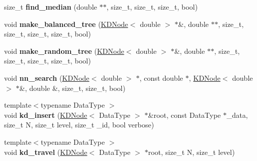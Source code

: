 \begin{DoxyCompactItemize}
\item 
\hypertarget{namespaceSimpleCluster_aac5892d8292ef724345d8c422519ae05}{size\-\_\-t {\bfseries find\-\_\-median} (double $\ast$$\ast$, size\-\_\-t, size\-\_\-t, size\-\_\-t, bool)}\label{namespaceSimpleCluster_aac5892d8292ef724345d8c422519ae05}

\item 
\hypertarget{namespaceSimpleCluster_a9b7733dc2edec70ad323beb9f3a9143e}{void {\bfseries make\-\_\-balanced\-\_\-tree} (\hyperlink{classSimpleCluster_1_1KDNode}{K\-D\-Node}$<$ double $>$ $\ast$\&, double $\ast$$\ast$, size\-\_\-t, size\-\_\-t, size\-\_\-t, size\-\_\-t, bool)}\label{namespaceSimpleCluster_a9b7733dc2edec70ad323beb9f3a9143e}

\item 
\hypertarget{namespaceSimpleCluster_a367a8fc15d6fd44d0c898dfc6bf6b409}{void {\bfseries make\-\_\-random\-\_\-tree} (\hyperlink{classSimpleCluster_1_1KDNode}{K\-D\-Node}$<$ double $>$ $\ast$\&, double $\ast$$\ast$, size\-\_\-t, size\-\_\-t, size\-\_\-t, size\-\_\-t, bool)}\label{namespaceSimpleCluster_a367a8fc15d6fd44d0c898dfc6bf6b409}

\item 
\hypertarget{namespaceSimpleCluster_a2b562a30c0311c53a2efda7c1ec2bcf6}{void {\bfseries nn\-\_\-search} (\hyperlink{classSimpleCluster_1_1KDNode}{K\-D\-Node}$<$ double $>$ $\ast$, const double $\ast$, \hyperlink{classSimpleCluster_1_1KDNode}{K\-D\-Node}$<$ double $>$ $\ast$\&, double \&, size\-\_\-t, size\-\_\-t, bool)}\label{namespaceSimpleCluster_a2b562a30c0311c53a2efda7c1ec2bcf6}

\item 
\hypertarget{namespaceSimpleCluster_af64e6d198c73f553404f1202e0b818eb}{{\footnotesize template$<$typename Data\-Type $>$ }\\void {\bfseries kd\-\_\-insert} (\hyperlink{classSimpleCluster_1_1KDNode}{K\-D\-Node}$<$ Data\-Type $>$ $\ast$\&root, const Data\-Type $\ast$\-\_\-data, size\-\_\-t N, size\-\_\-t level, size\-\_\-t \-\_\-id, bool verbose)}\label{namespaceSimpleCluster_af64e6d198c73f553404f1202e0b818eb}

\item 
\hypertarget{namespaceSimpleCluster_addb0a17c2b98fa9a4847e598dac6971a}{{\footnotesize template$<$typename Data\-Type $>$ }\\void {\bfseries kd\-\_\-travel} (\hyperlink{classSimpleCluster_1_1KDNode}{K\-D\-Node}$<$ Data\-Type $>$ $\ast$root, size\-\_\-t N, size\-\_\-t level)}\label{namespaceSimpleCluster_addb0a17c2b98fa9a4847e598dac6971a}


\end{DoxyCompactItemize}
